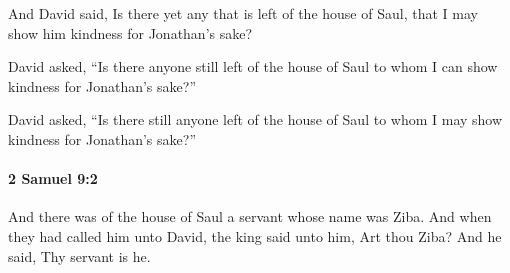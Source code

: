 			\begin{versebox}
					\item[BHS] 
					\item[ASV] And David said, Is there yet any that is left of the house of Saul, that I may show him kindness for Jonathan's sake?
					\item[NIV] David asked, “Is there anyone still left of the house of Saul to whom I can show kindness for Jonathan’s sake?”
					\item[NRSV] David asked, “Is there still anyone left of the house of Saul to whom I may show kindness for Jonathan’s sake?”
			\end{versebox}

		\paragraph{2 Samuel 9:2} %
			\label{2SAMUEL-9-2}

			And there was of the house of Saul a servant whose name was Ziba. And when they had called him unto David, the king said unto him, Art thou Ziba? And he said, Thy servant is he.

